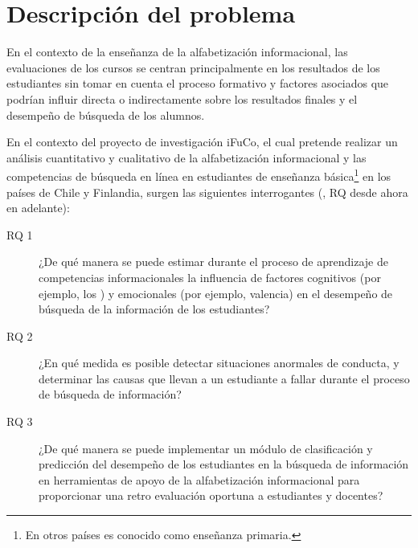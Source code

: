 \section{Descripción del problema}
\label{sec:descripcion-problema}
En el contexto de la enseñanza de la alfabetización informacional, las evaluaciones de los cursos se centran principalmente en los resultados de los estudiantes sin tomar en cuenta el proceso formativo y factores asociados que podrían influir directa o indirectamente sobre los resultados finales y el desempeño de búsqueda de los alumnos.  

En el contexto del proyecto de investigación iFuCo, el cual pretende realizar un análisis cuantitativo y cualitativo de la alfabetización informacional y las competencias de búsqueda en línea en estudiantes de enseñanza básica\footnote{En otros países es conocido como enseñanza primaria.} en los países de Chile y Finlandia, surgen las siguientes interrogantes (, RQ desde ahora en adelante):

\begin{description}
	\item [RQ 1] ¿De qué manera se puede estimar durante el proceso de aprendizaje de competencias informacionales la influencia de factores cognitivos (por ejemplo, los ) y emocionales (por ejemplo, valencia) en el desempeño de búsqueda de la información de los estudiantes?
	\item [RQ 2] ¿En qué medida es posible detectar situaciones anormales de conducta, y determinar las causas que llevan a un estudiante a fallar durante el proceso de búsqueda de información? 
	\item [RQ 3] ¿De qué manera se puede implementar un módulo de clasificación y predicción del desempeño de los estudiantes en la búsqueda de información en herramientas de apoyo de la alfabetización informacional para proporcionar una retro evaluación oportuna a estudiantes y docentes?
\end{description}